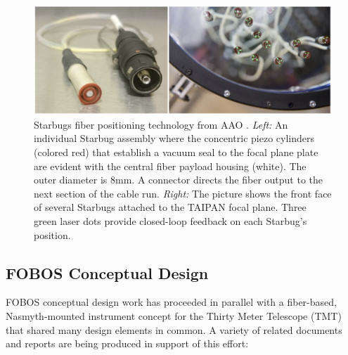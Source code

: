 \documentclass[oneside,11pt]{amsart}
\begin{document}
\begin{figure}[h!]
%
\vskip -0.1in
%
\includegraphics[width=\textwidth]{figs/starbugs.png}
%
\caption{\small Starbugs fiber positioning technology from AAO
\citep[from][]{staszak16}.  {\it Left:} An individual Starbug assembly
where the concentric piezo cylinders (colored red) that establish a
vacuum seal to the focal plane plate are evident with the central fiber
payload housing (white).  The outer diameter is 8mm.  A connector
directs the fiber output to the next section of the cable run. {\it
Right:} The picture shows the front face of several Starbugs attached to
the TAIPAN focal plane.  Three green laser dots provide closed-loop
feedback on each Starbug's position.}
%
\label{fig:starbugs}
%
\end{figure}


\subsection{FOBOS Conceptual Design}

FOBOS conceptual design work has proceeded in parallel with a
fiber-based, Nasmyth-mounted instrument concept for the Thirty Meter
Telescope (TMT) that shared many design elements in common.  A variety
of related documents and reports are being produced in support of this
effort:
\end{document}

